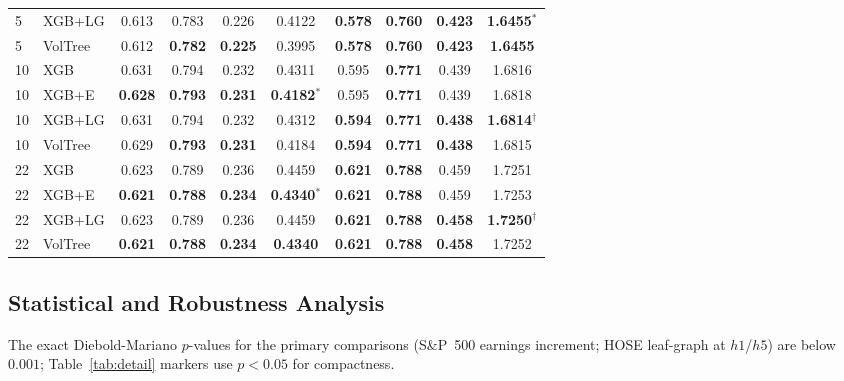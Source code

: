 \documentclass[runningheads,a4paper]{llncs}
\begin{document}
\begin{table}[t]
\begin{tabular}{ll cccc cccc}
5 & XGB+LG   & 0.613 & 0.783 & 0.226 & 0.4122 & \textbf{0.578} & \textbf{0.760} & \textbf{0.423} & \textbf{1.6455$^{*}$} \\
5 & VolTree  & 0.612 & \textbf{0.782} & \textbf{0.225} & 0.3995 & \textbf{0.578} & \textbf{0.760} & \textbf{0.423} & \textbf{1.6455} \\
\midrule
10 & XGB      & 0.631 & 0.794 & 0.232 & 0.4311 & 0.595 & \textbf{0.771} & 0.439 & 1.6816 \\
10 & XGB+E    & \textbf{0.628} & \textbf{0.793} & \textbf{0.231} & \textbf{0.4182$^{*}$} & 0.595 & \textbf{0.771} & 0.439 & 1.6818 \\
10 & XGB+LG   & 0.631 & 0.794 & 0.232 & 0.4312 & \textbf{0.594} & \textbf{0.771} & \textbf{0.438} & \textbf{1.6814$^{\dagger}$} \\
10 & VolTree  & 0.629 & \textbf{0.793} & \textbf{0.231} & 0.4184 & \textbf{0.594} & \textbf{0.771} & \textbf{0.438} & 1.6815 \\
\midrule
22 & XGB      & 0.623 & 0.789 & 0.236 & 0.4459 & \textbf{0.621} & \textbf{0.788} & 0.459 & 1.7251 \\
22 & XGB+E    & \textbf{0.621} & \textbf{0.788} & \textbf{0.234} & \textbf{0.4340$^{*}$} & \textbf{0.621} & \textbf{0.788} & 0.459 & 1.7253 \\
22 & XGB+LG   & 0.623 & 0.789 & 0.236 & 0.4459 & \textbf{0.621} & \textbf{0.788} & \textbf{0.458} & \textbf{1.7250$^{\dagger}$} \\
22 & VolTree  & \textbf{0.621} & \textbf{0.788} & \textbf{0.234} & \textbf{0.4340} & \textbf{0.621} & \textbf{0.788} & \textbf{0.458} & 1.7252 \\
\bottomrule
\end{tabular}
\end{table}

\subsection{Statistical and Robustness Analysis}\label{sec:robust}
The exact Diebold-Mariano $p$-values for the primary comparisons (S\&P~500 earnings increment; HOSE
leaf-graph at $h1$/$h5$) are below $0.001$; Table~\ref{tab:detail} markers use $p<0.05$ for compactness.
\end{document}
